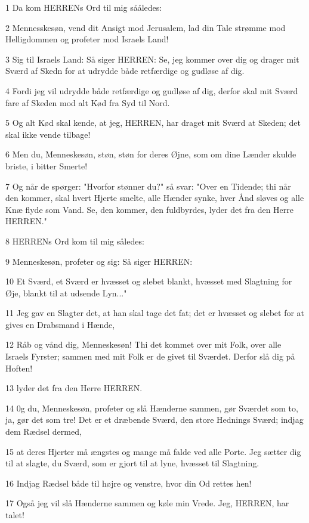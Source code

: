 \par 1 Da kom HERRENs Ord til mig sååledes:
\par 2 Mennesskesøn, vend dit Ansigt mod Jerusalem, lad din Tale strømme mod Helligdommen og profeter mod Israels Land!
\par 3 Sig til Israels Land: Så siger HERREN: Se, jeg kommer over dig og drager mit Sværd af Skedn for at udrydde både retfærdige og gudløse af dig.
\par 4 Fordi jeg vil udrydde både retfærdige og gudløse af dig, derfor skal mit Sværd fare af Skeden mod alt Kød fra Syd til Nord.
\par 5 Og alt Kød skal kende, at jeg, HERREN, har draget mit Sværd at Skeden; det skal ikke vende tilbage!
\par 6 Men du, Menneskesøn, støn, støn for deres Øjne, som om dine Lænder skulde briste, i bitter Smerte!
\par 7 Og når de spørger: "Hvorfor stønner du?" så svar: "Over en Tidende; thi når den kommer, skal hvert Hjerte smelte, alle Hænder synke, hver Ånd sløves og alle Knæ flyde som Vand. Se, den kommer, den fuldbyrdes, lyder det fra den Herre HERREN."
\par 8 HERRENs Ord kom til mig således:
\par 9 Menneskesøn, profeter og sig: Så siger HERREN:
\par 10 Et Sværd, et Sværd er hvæsset og slebet blankt, hvæsset med Slagtning for Øje, blankt til at udsende Lyn..."
\par 11 Jeg gav en Slagter det, at han skal tage det fat; det er hvæsset og slebet for at gives en Drabsmand i Hænde,
\par 12 Råb og vånd dig, Menneskesøn! Thi det kommet over mit Folk, over alle Israels Fyrster; sammen med mit Folk er de givet til Sværdet. Derfor slå dig på Hoften!
\par 13 lyder det fra den Herre HERREN.
\par 14 0g du, Menneskesøn, profeter og slå Hænderne sammen, gør Sværdet som to, ja, gør det som tre! Det er et dræbende Sværd, den store Hednings Sværd; indjag dem Rædsel dermed,
\par 15 at deres Hjerter må ængstes og mange må falde ved alle Porte. Jeg sætter dig til at slagte, du Sværd, som er gjort til at lyne, hvæsset til Slagtning.
\par 16 Indjag Rædsel både til højre og venstre, hvor din Od rettes hen!
\par 17 Også jeg vil slå Hænderne sammen og køle min Vrede. Jeg, HERREN, har talet!
